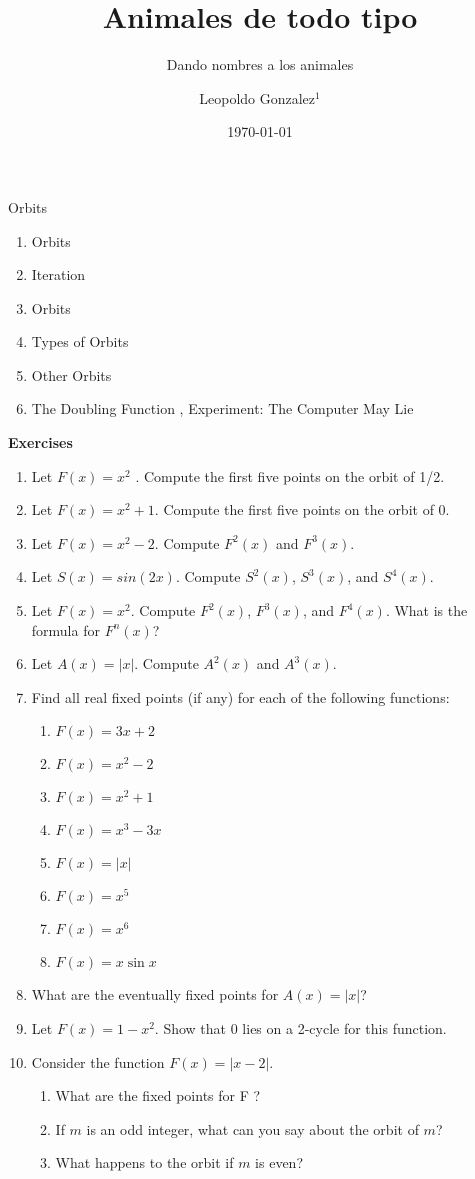 \documentclass{beamer}
\title[Animales]{Animales de todo tipo}
\subtitle{Dando nombres a los animales}
\author[Leopooldo Gonzalez - santosg572@gmail.com]{
Leopoldo Gonzalez$^{1}$ }
\institute[EDEN \& HELL]{
  $^{1}$
  Instituto de Neurobiologia, UNAM\\
  \texttt{$^{1}$lgs@unam.mx}
}
\date{\today}
\begin{document}
\begin{frame}{Orbits}

\begin{enumerate}
\item Orbits
\item Iteration
\item Orbits
\item Types of Orbits
\item Other Orbits
\item The Doubling Function
\ite, Experiment: The Computer May Lie
\end{enumerate}
\end{frame}



\begin{frame}


\textbf{Exercises}

\hfill

\begin{enumerate}
\item Let $F(x) = x^2$ . Compute the ﬁrst ﬁve points on the orbit of 1/2.
\item Let $F(x) = x^2 + 1$. Compute the ﬁrst ﬁve points on the orbit of 0.
\item Let $F(x) = x^2 - 2$. Compute $F^2(x)$ and $F^3(x)$.
\item Let $S(x) = sin(2x)$. Compute $S^2(x)$, $S^3(x)$, and $S^4(x)$.
\item Let $F(x) = x^2$. Compute $F^2(x)$, $F^3 (x)$, and $F^4(x)$. What is the formula for $F^n(x)$?
\item Let $A(x) = |x|$. Compute $A^2(x)$ and $A^3(x)$.
\item Find all real ﬁxed points (if any) for each of the following functions:
\begin{enumerate}
\item $F(x) = 3x + 2$
\item $F(x) = x^2 - 2$
\item $F(x) = x^2 + 1$
\item $F(x) = x^3 - 3x$
\item $F(x) = |x|$
\item $F(x) = x^5$
\item $F(x) = x^6$
\item $F (x) = x \sin x$
\end{enumerate}

\item What are the eventually ﬁxed points for $A(x) = |x|$?
\item Let $F(x) = 1 -x^2$. Show that 0 lies on a 2-cycle for this function.
\item Consider the function $F(x) = |x - 2|$.
\begin{enumerate}
\item What are the ﬁxed points for F ?
\item If $m$ is an odd integer, what can you say about the orbit of $m$?
\item What happens to the orbit if $m$ is even?
\end{enumerate}


\end{enumerate}
\end{frame}
\end{document}
